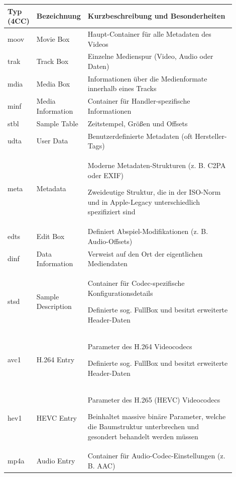 \begin{table}
    \centering
    \begin{tabular}{>{\raggedright\arraybackslash}p{0.05\linewidth}>{\raggedright\arraybackslash}p{0.2\linewidth}>{\raggedright\arraybackslash}p{0.65\linewidth}}\toprule
         \textbf{Typ (4CC)}&  \textbf{Bezeichnung}&\textbf{Kurzbeschreibung und Besonderheiten}\\\midrule
         moov&  Movie Box&Haupt-Container für alle Metadaten des Videos\\\midrule
         trak&  Track Box&Einzelne Medienspur (Video, Audio oder Daten)\\\midrule
         mdia&  Media Box&Informationen über die Medienformate innerhalb eines Tracks\\\midrule
         minf&  Media Information&Container für Handler-spezifische Informationen\\\midrule
         stbl&  Sample Table&Zeitstempel, Größen und Offsets\\\midrule
         udta&  User Data&Benutzerdefinierte Metadaten (oft Hersteller-Tags)\\\midrule
         meta&  Metadata&Moderne Metadaten-Strukturen (z. B. C2PA oder EXIF)

Zweideutige Struktur, die in der ISO-Norm und in Apple-Legacy unterschiedlich spezifiziert sind\\\midrule
         edts&  Edit Box&Definiert Abspiel-Modifikationen (z. B. Audio-Offsets)\\\midrule
         dinf&  Data Information&Verweist auf den Ort der eigentlichen Mediendaten\\\midrule
 stsd& Sample Description&Container für Codec-spezifische Konfigurationsdetails

Definierte sog. FullBox und besitzt erweiterte Header-Daten\\\midrule
 avc1& H.264 Entry&Parameter des H.264 Videocodecs

Definierte sog. FullBox und besitzt erweiterte Header-Daten\\\midrule
 hev1& HEVC Entry&Parameter des H.265 (HEVC) Videocodecs

Beinhaltet massive binäre Parameter, welche die Baumstruktur unterbrechen und gesondert behandelt werden müssen\\\midrule
 mp4a& Audio Entry&Container für Audio-Codec-Einstellungen (z. B. AAC)


\end{tabular}
\end{table}
